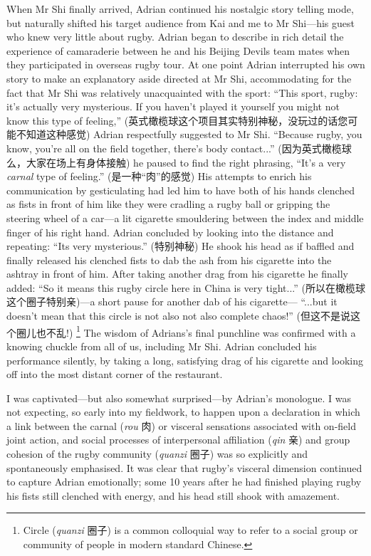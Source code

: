 \begin{CJK}{UTF8}{gbsn}
When Mr Shi finally arrived, Adrian continued his nostalgic story telling mode, but naturally shifted his target audience from Kai and me to Mr Shi---his guest who knew very little about rugby.  Adrian began to describe in rich detail the experience of camaraderie between he and his Beijing Devils team mates when they participated in overseas rugby tour.  At one point Adrian interrupted his own story to make an explanatory aside directed at Mr Shi, accommodating for the fact that Mr Shi was relatively unacquainted with the sport: ``This sport, rugby: it's actually very mysterious. If you haven't played it yourself you might not know this type of feeling,'' (英式橄榄球这个项目其实特别神秘，没玩过的话您可能不知道这种感觉) Adrian respectfully suggested to Mr Shi.  ``Because rugby, you know, you're all on the field together, there's body contact...'' (因为英式橄榄球么，大家在场上有身体接触) he paused to find the right phrasing,  ``It's a very \textit{carnal} type of feeling.'' (是一种``肉''的感觉) His attempts to enrich his communication by gesticulating had led him to have both of his hands clenched as fists in front of him like they were cradling a rugby ball or gripping the steering wheel of a car---a lit cigarette smouldering between the index and middle finger of his right hand.  Adrian concluded by looking into the distance and repeating: ``Its very mysterious.'' (特别神秘) He shook his head as if baffled and finally released his clenched fists to dab the ash from his cigarette into the ashtray in front of him.  After taking another drag from his cigarette he finally added: ``So it means this rugby circle here in China is very tight...'' (所以在橄榄球这个圈子特别亲)---a short pause for another dab of his cigarette--- ``...but it doesn't mean that this circle is not also not also complete chaos!'' (但这不是说这个圈儿也不乱!)
  \footnote{Circle (\textit{quanzi} 圈子) is a common colloquial way to refer to a social group or community of people in modern standard Chinese.}
The wisdom of Adrians's final punchline was confirmed with a knowing chuckle from all of us, including Mr Shi. Adrian concluded his performance silently, by taking a long, satisfying drag of his cigarette and looking off into the most distant corner of the restaurant.

I was captivated---but also somewhat surprised---by Adrian's monologue.  I was not expecting, so early into my fieldwork, to happen upon a declaration in which a link between the carnal (\textit{rou} 肉) or visceral sensations associated with on-field joint action, and social processes of interpersonal affiliation (\textit{qin} 亲) and group cohesion of the rugby community (\textit{quanzi} 圈子) was so explicitly and spontaneously emphasised.  It was clear that rugby's visceral dimension continued to capture Adrian emotionally; some 10 years after he had finished playing rugby his fists still clenched with energy, and his head still shook with amazement.


\end{CJK}

